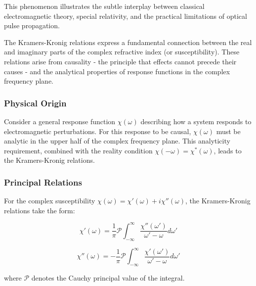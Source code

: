 \documentclass[
  a4paper,
]{book}
\begin{document}
This phenomenon illustrates the subtle interplay between classical
electromagnetic theory, special relativity, and the practical
limitations of optical pulse propagation.

\begin{tcolorbox}[enhanced jigsaw, coltitle=black, title=\textcolor{quarto-callout-note-color}{\faInfo}\hspace{0.5em}{Kramers-Kronig Relations}, colframe=quarto-callout-note-color-frame, toprule=.15mm, opacitybacktitle=0.6, left=2mm, opacityback=0, breakable, toptitle=1mm, bottomtitle=1mm, leftrule=.75mm, arc=.35mm, titlerule=0mm, colbacktitle=quarto-callout-note-color!10!white, rightrule=.15mm, bottomrule=.15mm, colback=white]

The Kramers-Kronig relations express a fundamental connection between
the real and imaginary parts of the complex refractive index (or
susceptibility). These relations arise from causality - the principle
that effects cannot precede their causes - and the analytical properties
of response functions in the complex frequency plane.

\subsubsection{Physical Origin}\label{physical-origin}

Consider a general response function \(\chi(\omega)\) describing how a
system responds to electromagnetic perturbations. For this response to
be causal, \(\chi(\omega)\) must be analytic in the upper half of the
complex frequency plane. This analyticity requirement, combined with the
reality condition \(\chi(-\omega)=\chi^*(\omega)\), leads to the
Kramers-Kronig relations.

\subsubsection{Principal Relations}\label{principal-relations}

For the complex susceptibility
\(\chi(\omega)=\chi'(\omega)+i\chi''(\omega)\), the Kramers-Kronig
relations take the form:

\[
\chi'(\omega) = \frac{1}{\pi}\mathcal{P}\int_{-\infty}^{\infty}\frac{\chi''(\omega')}{\omega'-\omega}d\omega'
\]

\[
\chi''(\omega) = -\frac{1}{\pi}\mathcal{P}\int_{-\infty}^{\infty}\frac{\chi'(\omega')}{\omega'-\omega}d\omega'
\]

where \(\mathcal{P}\) denotes the Cauchy principal value of the
integral.


\end{tcolorbox}
\end{document}
